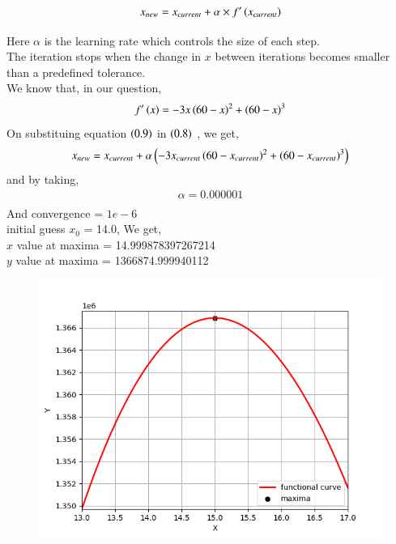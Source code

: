 \documentclass[journal]{IEEEtran}
\begin{document}
\begin{align}
    x_{new} = x_{current} + \alpha \times f^\prime\left(x_{current}\right)
\end{align}

Here $\alpha$ is the learning rate which controls the size of each step.\\
The iteration stops when the change in $x$ between iterations becomes smaller than a predefined tolerance.\\
We know that, in our question,
\begin{align}
    f^\prime \left(x\right) = -3x\left(60-x\right)^2 + \left(60-x\right)^3
\end{align}
On substituing equation $\left(0.9\right)$ in $\left(0.8\right)$ , we get,
\begin{align}
    x_{new} = x_{current} + \alpha\left(-3x_{current}\left(60-x_{current}\right)^2 + \left(60-x_{current}\right)^3\right)
\end{align}
and by taking,
\begin{align}
    \alpha = 0.000001\\
\end{align}
And convergence = $1e-6$\\
initial guess $x_0$ = 14.0,
We get,\\
$x$ value at maxima =  14.999878397267214\\
$y$ value at maxima =  1366874.999940112\\

\begin{figure}[h!]
   \centering
   \includegraphics[width=0.75\columnwidth]{figures/Figure_1.png}
   \label{graph of the function}
\end{figure}
\end{document}
